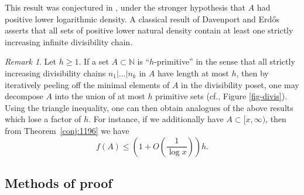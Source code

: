 \documentclass[12pt]{amsart}
\theoremstyle{definition}
\theoremstyle{remark}
\newtheorem{remark}[theorem]{Remark}
\numberwithin{equation}{section}
\newcommand{\N}{{\mathbb N}}
\newcommand{\1}{{\mathbf 1}}
\newcommand{\Erdos}{{Erd\H{o}s}}
\begin{document}
This result was conjectured in \cite{ess0}, under the stronger hypothesis that $A$ had positive lower logarithmic density.  A classical result of Davenport and \Erdos{} \cite{davenport} asserts that all sets of positive lower natural density contain at least one strictly increasing infinite divisibility chain.

\begin{remark}\label{GPT-rem-1} Let $h \geq 1$.  If a set $A \subset \N$ is ``$h$-primitive'' in the sense that all strictly increasing divisibility chains $n_1 | \dots | n_k$ in $A$ have length at most $h$, then by iteratively peeling off the minimal elements of $A$ in the divisibility poset, one may decompose $A$ into the union of at most $h$ primitive sets (cf., Figure \ref{fig-divis}).  Using the triangle inequality, one can then obtain analogues of the above results which lose a factor of $h$.  For instance, if we additionally have $A \subset [x,\infty)$, then from Theorem~\ref{conj:1196} we have 
\begin{equation}\label{fah}
f(A) \leq \left(1 + O\left(\frac{1}{\log x}\right)\right) h.
\end{equation}
\end{remark}

\subsection{Methods of proof}
\end{document}
